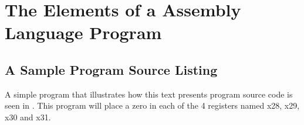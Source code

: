 \chapter{The Elements of a Assembly Language Program}
\label{chapter:elements}


\section{A Sample Program Source Listing}

A simple program that illustrates how this text presents 
program source code is seen in .
This program will place a zero in each of the 4 registers 
named x28, x29, x30 and x31.


